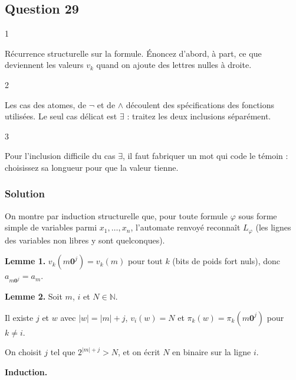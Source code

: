 \documentclass[11pt,a4paper]{article}
\begin{document}
\hypertarget{question-29}{%
\subsection{Question 29}\label{question-29}}

\begin{indication}{1}

Récurrence structurelle sur la formule. Énoncez d'abord, à part, ce que deviennent les valeurs \(v_k\) quand on ajoute des lettres nulles à droite.

\end{indication}

\begin{indication}{2}

Les cas des atomes, de \(\neg\) et de \(\wedge\) découlent des spécifications des fonctions utilisées. Le seul cas délicat est \(\exists\) : traitez les deux inclusions séparément.

\end{indication}

\begin{indication}{3}

Pour l'inclusion difficile du cas \(\exists\), il faut fabriquer un mot qui code le témoin : choisissez sa longueur pour que la valeur tienne.

\end{indication}

\hypertarget{solution-28}{%
\subsubsection{Solution}\label{solution-28}}

On montre par induction structurelle que, pour toute formule \(\varphi\) sous forme simple de variables parmi \(x_1,\dots,x_n\), l'automate renvoyé reconnaît \(L_\varphi\) (les lignes des variables non libres y sont quelconques).

\textbf{Lemme 1.} \(v_k(m{\mathbf{0}}^j)=v_k(m)\) pour tout \(k\) (bits de poids fort nuls), donc \(a_{m{\mathbf{0}}^j}=a_m\).

\textbf{Lemme 2.} Soit \(m\), \(i\) et \(N\in\mathbb{N}\).

Il existe \(j\) et \(w\) avec \(|w|=|m|+j\), \(v_i(w)=N\) et \(\pi_k(w)=\pi_k(m{\mathbf{0}}^j)\) pour \(k\ne i\).

On choisit \(j\) tel que \(2^{|m|+j}>N\), et on écrit \(N\) en binaire sur la ligne \(i\).

\textbf{Induction.}
\end{document}
